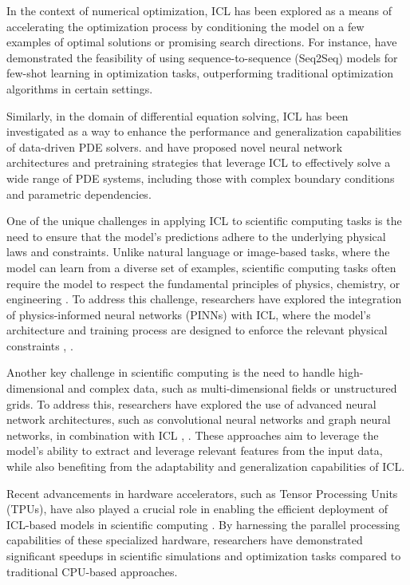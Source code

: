 \documentclass[11pt]{article}
\begin{document}
In the context of numerical optimization, ICL has been explored as a means of accelerating the optimization process by conditioning the model on a few examples of optimal solutions or promising search directions. For instance, \cite{ref32} have demonstrated the feasibility of using sequence-to-sequence (Seq2Seq) models for few-shot learning in optimization tasks, outperforming traditional optimization algorithms in certain settings.

Similarly, in the domain of differential equation solving, ICL has been investigated as a way to enhance the performance and generalization capabilities of data-driven PDE solvers. \cite{ref262} and \cite{ref263} have proposed novel neural network architectures and pretraining strategies that leverage ICL to effectively solve a wide range of PDE systems, including those with complex boundary conditions and parametric dependencies.

One of the unique challenges in applying ICL to scientific computing tasks is the need to ensure that the model's predictions adhere to the underlying physical laws and constraints. Unlike natural language or image-based tasks, where the model can learn from a diverse set of examples, scientific computing tasks often require the model to respect the fundamental principles of physics, chemistry, or engineering \cite{ref264}. To address this challenge, researchers have explored the integration of physics-informed neural networks (PINNs) with ICL, where the model's architecture and training process are designed to enforce the relevant physical constraints \cite{ref262}, \cite{ref263}.

Another key challenge in scientific computing is the need to handle high-dimensional and complex data, such as multi-dimensional fields or unstructured grids. To address this, researchers have explored the use of advanced neural network architectures, such as convolutional neural networks and graph neural networks, in combination with ICL \cite{ref265}, \cite{ref266}. These approaches aim to leverage the model's ability to extract and leverage relevant features from the input data, while also benefiting from the adaptability and generalization capabilities of ICL.

Recent advancements in hardware accelerators, such as Tensor Processing Units (TPUs), have also played a crucial role in enabling the efficient deployment of ICL-based models in scientific computing \cite{ref267}. By harnessing the parallel processing capabilities of these specialized hardware, researchers have demonstrated significant speedups in scientific simulations and optimization tasks compared to traditional CPU-based approaches.
\end{document}
